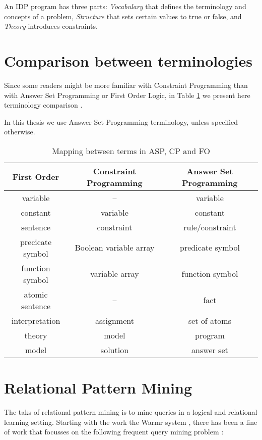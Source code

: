 An IDP program has three parts: \textit{Vocabulary} that defines the terminology and concepts of a problem, \textit{Structure} that sets certain values to true or false, and \textit{Theory} introduces constraints.




\section{Comparison between terminologies}
Since some readers might be more familiar with Constraint Programming than with Answer Set Programming or First Order Logic, in Table \ref{tab:terminology_comparison} we present here terminology comparison \parencite{phd_broes}.

In this thesis we use Answer Set Programming terminology, unless specified otherwise.
\begin{table}
  \centering
  \begin{tabular}{c | c | c}
    \textbf{First Order} & \textbf{Constraint Programming} & \textbf{Answer Set Programming}\\ \hline
    variable & --         & variable\\
    constant & variable   & constant \\
    sentence & constraint & rule/constraint \\
    precicate symbol & Boolean variable array & predicate symbol\\
    function symbol &  variable array & function symbol\\
    atomic sentence & -- & fact\\
    interpretation & assignment & set of atoms\\
    theory & model & program \\
    model & solution & answer set
  \end{tabular}
  \caption{Mapping between terms in ASP, CP and FO}
  \label{tab:terminology_comparison}
\end{table}


\section{Relational Pattern Mining}
The taks of relational pattern mining is to mine queries in a logical and relational learning setting. Starting with the work the Warmr system \parencite{warmr}, there has been a line of work that focusses on the following frequent query mining problem \parencite{bagm,farmer,condensed_luc}:

